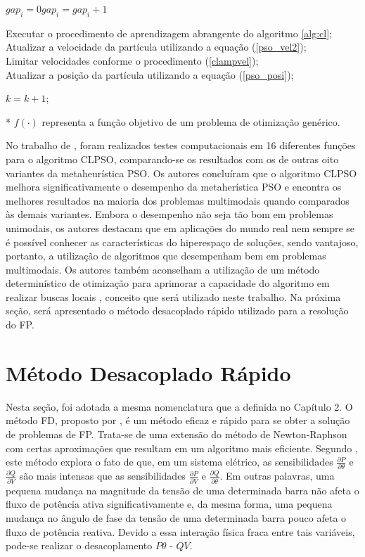 \documentclass[
	12pt,				%
	openany,			%
	twoside,			%
	a4paper,			%
	chapter=TITLE,		%
	section=Title,		%
	subsection=Title,	%
	subsubsection=Title,%
	english,			%
	french,				%
	spanish,			%
	brazil			%
	]{abntex2}
\begin{document}
\begin{ERRATA}
\begin{algorithm}[htb]
{{{
{
$gap_i=0$}{$gap_i=gap_i+1$}

Executar o procedimento de aprendizagem abrangente do algoritmo \ref{alg:cl};\\
Atualizar a velocidade da partícula utilizando a equação (\ref{pso_vel2});\\
Limitar velocidades conforme o procedimento (\ref{clampvel});\\
Atualizar a posição da partícula utilizando a equação (\ref{pso_posi});\\
}
$k=k+1$;
}
}

* $f(\cdot)$ representa a função objetivo de um problema de otimização genérico.\\
\end{algorithm}

No trabalho de , foram realizados testes computacionais em 16 diferentes funções para o algoritmo CLPSO, comparando-se os resultados com os de outras oito variantes da metaheurística PSO. Os autores concluíram que o algoritmo CLPSO melhora significativamente o desempenho da metaherística PSO e encontra os melhores resultados na maioria dos problemas multimodais quando comparados às demais variantes. Embora o desempenho não seja tão bom em problemas unimodais, os autores destacam que em aplicações do mundo real nem sempre se é possível conhecer as características do hiperespaço de soluções, sendo vantajoso, portanto, a utilização de algoritmos que desempenham bem em problemas multimodais. Os autores também aconselham a utilização de um método determinístico de otimização para aprimorar a capacidade do algoritmo em realizar buscas locais \cite{clpso_ls, clpso}, conceito que será utilizado neste trabalho. Na próxima seção, será apresentado o método desacoplado rápido utilizado para a resolução do FP.

\section{Método Desacoplado Rápido}

Nesta seção, foi adotada a mesma nomenclatura que a definida no Capítulo 2. O método FD, proposto por , é um método eficaz e rápido para se obter a solução de problemas de FP. Trata-se de uma extensão do método de Newton-Raphson com certas aproximações que resultam em um algoritmo mais eficiente. Segundo , este método explora o fato de que, em um sistema elétrico, as sensibilidades $\frac{\partial P}{\partial \theta}$ e $\frac{\partial Q}{\partial V}$ são mais intensas que as sensibilidades $\frac{\partial P}{\partial V}$ e $\frac{\partial Q}{\partial \theta}$. Em outras palavras, uma pequena mudança na magnitude da tensão de uma determinada barra não afeta o fluxo de potência ativa significativamente e, da mesma forma, uma pequena mudança no ângulo de fase da tensão de uma determinada barra pouco afeta o fluxo de potência reativa. Devido a essa interação física fraca entre tais variáveis, pode-se realizar o desacoplamento $P\theta$ - $QV$.


\end{ERRATA}
\end{document}
